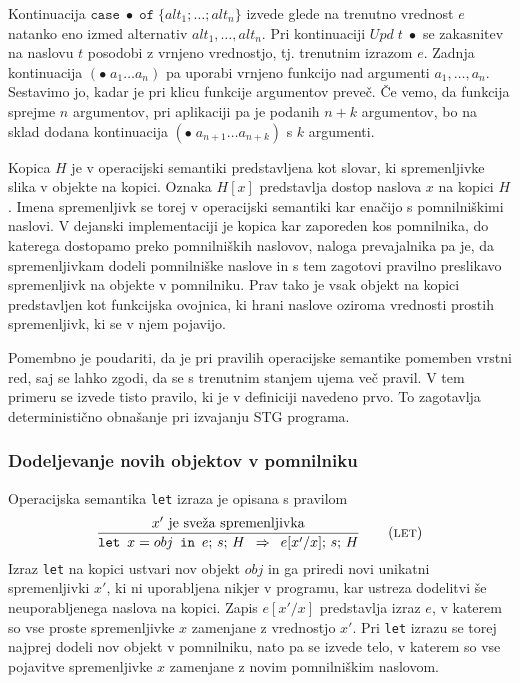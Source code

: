 Kontinuacija $\texttt{case} \; \bullet \; \texttt{of} \; \{ alt_1; \dots; alt_n \}$ izvede glede na trenutno vrednost $e$ natanko eno izmed alternativ $alt_1, \dots, alt_n$. Pri kontinuaciji $\textit{Upd} \; t \; \bullet$ se zakasnitev na naslovu $t$ posodobi z vrnjeno vrednostjo, tj. trenutnim izrazom $e$. Zadnja kontinuacija $(\bullet \; a_1 \dots a_n)$ pa uporabi vrnjeno funkcijo nad argumenti $a_1, \dots, a_n$. Sestavimo jo, kadar je pri klicu funkcije argumentov preveč. Če vemo, da funkcija sprejme $n$ argumentov, pri aplikaciji pa je podanih $n + k$ argumentov, bo na sklad dodana kontinuacija $(\bullet \; a_{n + 1 } \dots a_{ n + k })$ s $k$ argumenti.

Kopica $H$ je v operacijski semantiki predstavljena kot slovar, ki spremenljivke slika v objekte na kopici. Oznaka $H[x]$ predstavlja dostop naslova $x$ na kopici $H$. Imena spremenljivk se torej v operacijski semantiki kar enačijo s pomnilniškimi naslovi. V dejanski implementaciji je kopica kar zaporeden kos pomnilnika, do katerega dostopamo preko pomnilniških naslovov, naloga prevajalnika pa je, da spremenljivkam dodeli pomnilniške naslove in s tem zagotovi pravilno preslikavo spremenljivk na objekte v pomnilniku. Prav tako je vsak objekt na kopici predstavljen kot funkcijska ovojnica, ki hrani naslove oziroma vrednosti prostih spremenljivk, ki se v njem pojavijo.

Pomembno je poudariti, da je pri pravilih operacijske semantike pomemben vrstni red, saj se lahko zgodi, da se s trenutnim stanjem ujema več pravil.  V tem primeru se izvede tisto pravilo, ki je v definiciji navedeno prvo. To zagotavlja deterministično obnašanje pri izvajanju STG programa.

\subsubsection{Dodeljevanje novih objektov v pomnilniku}

Operacijska semantika \texttt{let} izraza je opisana s pravilom
\begin{equation*}
\infer[let]{
	\text{$x'$ je sveža spremenljivka}
}{
	\texttt{let} \enspace x = obj \enspace \texttt{in} \enspace e; \, s; \, H
}{
	e[x'/x]; \, s; \, H
}
\end{equation*}
Izraz \texttt{let} na kopici ustvari nov objekt $obj$ in ga priredi novi unikatni spremenljivki $x'$, ki ni uporabljena nikjer v programu, kar ustreza dodelitvi še neuporabljenega naslova na kopici. Zapis $e[x' / x]$ predstavlja izraz $e$, v katerem so vse proste spremenljivke $x$ zamenjane z vrednostjo $x'$. Pri \texttt{let} izrazu se torej najprej dodeli nov objekt v pomnilniku, nato pa se izvede telo, v katerem so vse pojavitve spremenljivke $x$ zamenjane z novim pomnilniškim naslovom.

